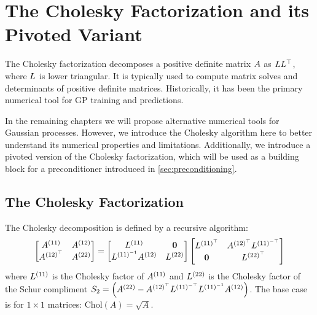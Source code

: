 \section{The Cholesky Factorization and its Pivoted Variant}

The Cholesky factorization decomposes a positive definite matrix $A$ as $L L^{\top}$, where $L$ is lower triangular.
It is typically used to compute matrix solves and determinants of positive definite matrices.
Historically, it has been the primary numerical tool for GP training and predictions.

In the remaining chapters we will propose alternative numerical tools for Gaussian processes.
However, we introduce the Cholesky algorithm here to better understand its numerical properties and limitations.
Additionally, we introduce a pivoted version of the Cholesky factorization, which will be used as a building block for a preconditioner introduced in \cref{sec:preconditioning}.

\subsection{The Cholesky Factorization}
%
The Cholesky decomposition is defined by a recursive algorithm:
%
\begin{equation}
 \label{eqn:cholesky_full}
 \begin{bmatrix} A^{(11)} & A^{(12)} \\ A^{(12)^\top} & A^{(22)}\end{bmatrix}
 =
 \begin{bmatrix} L^{(11)} & \mathbf{0} \\ L^{(11)^{-1}} A^{(12)} & L^{(22)}\end{bmatrix}
 \begin{bmatrix} L^{(11)^\top} & A^{(12)^\top} L^{(11)^{-\top}} \\ \mathbf{0} & L^{(22)^\top}\end{bmatrix}
\end{equation}
%
where $L^{(11)}$ is the Cholesky factor of $A^{(11)}$ and $L^{(22)}$ is the Cholesky factor of the Schur compliment $S_2 = \left( A^{(22)} - A^{(12)^\top} L^{(11)^{-\top}} L^{(11)^{-1}} A^{(12)} \right)$.
The base case is for $1 \times 1$ matrices: $\text{Chol}(A) = \sqrt{A}$.

